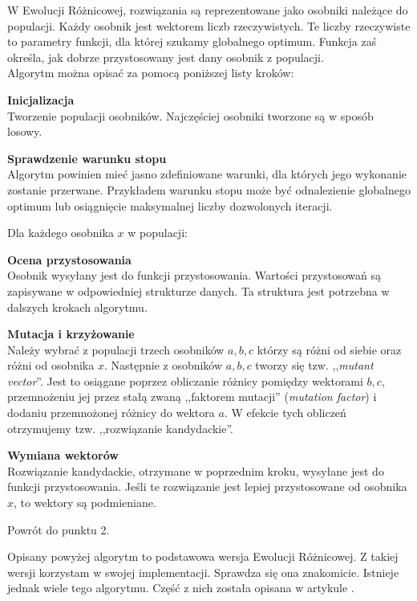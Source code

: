 W Ewolucji Różnicowej, rozwiązania są reprezentowane jako osobniki należące do populacji. Każdy osobnik jest wektorem liczb rzeczywistych. Te liczby rzeczywiste to parametry funkcji, dla której szukamy globalnego optimum. Funkcja zaś określa, jak dobrze przystosowany jest dany osobnik z populacji. \\
Algorytm można opisać za pomocą poniższej listy kroków:
\begin{enumerate*}
\item \textbf{Inicjalizacja} \\
Tworzenie populacji osobników. Najczęściej osobniki tworzone są w sposób losowy.
\item \textbf{Sprawdzenie warunku stopu} \\
Algorytm powinien mieć jasno zdefiniowane warunki, dla których jego wykonanie zostanie przerwane. Przykładem warunku stopu może być odnalezienie globalnego optimum lub osiągnięcie maksymalnej liczby dozwolonych iteracji.
\item Dla każdego osobnika $x$ w populacji:
\begin{enumerate*}
\item \textbf{Ocena przystosowania} \\
Osobnik wysyłany jest do funkcji przystosowania. Wartości przystosowań są zapisywane w odpowiedniej strukturze danych. Ta struktura jest potrzebna w dalszych krokach algorytmu.
\item \textbf{Mutacja i krzyżowanie} \\
Należy wybrać z populacji trzech osobników $a, b, c$ którzy są różni od siebie oraz różni od osobnika $x$. Następnie z osobników $a, b, c$ tworzy się tzw. ,,\textit{mutant vector}''. Jest to osiągane poprzez obliczanie różnicy pomiędzy wektorami $b, c$, przemnożeniu jej przez stałą zwaną ,,faktorem mutacji'' (\textit{mutation factor}) i dodaniu przemnożonej różnicy do wektora $a$.
W efekcie tych obliczeń otrzymujemy tzw. ,,rozwiązanie kandydackie''.
\item \textbf{Wymiana wektorów} \\
Rozwiązanie kandydackie, otrzymane w poprzednim kroku, wysyłane jest do funkcji przystosowania. Jeśli te rozwiązanie jest lepiej przystosowane od osobnika $x$, to wektory są podmieniane.
\end{enumerate*}
\item Powrót do punktu 2.
\end{enumerate*}

Opisany powyżej algorytm to podstawowa wersja Ewolucji Różnicowej. Z takiej wersji korzystam w swojej implementacji. Sprawdza się ona znakomicie. Istnieje jednak wiele tego algorytmu. Część z nich została opisana w artykule \cite{de:tutorial}.

